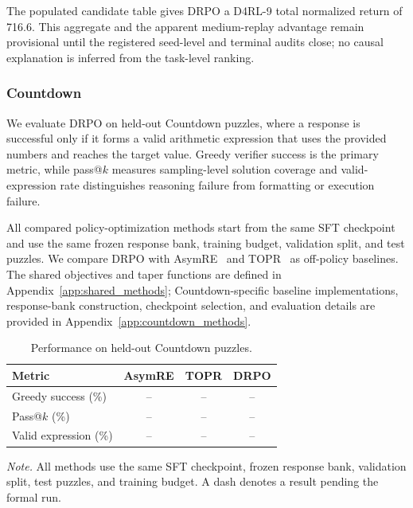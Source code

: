 The populated candidate table gives DRPO a D4RL-9 total normalized
return of 716.6. This aggregate and the apparent medium-replay advantage
remain provisional until the registered seed-level and terminal audits
close; no causal explanation is inferred from the task-level ranking.

\subsubsection{Countdown}
\label{sec:countdown_performance}

We evaluate DRPO on held-out Countdown puzzles, where a response is
successful only if it forms a valid arithmetic expression that uses the
provided numbers and reaches the target value. Greedy verifier success
is the primary metric, while pass@$k$ measures sampling-level solution
coverage and valid-expression rate distinguishes reasoning failure from
formatting or execution failure.

All compared policy-optimization methods start from the same SFT
checkpoint and use the same frozen response bank, training budget,
validation split, and test puzzles. We compare DRPO with
AsymRE~\citep{arnal2025asymmetric} and
TOPR~\citep{leroux2025tapered} as off-policy baselines.
The shared objectives and taper functions are defined in
Appendix~\ref{app:shared_methods}; Countdown-specific baseline
implementations, response-bank construction, checkpoint selection, and
evaluation details are provided in
Appendix~\ref{app:countdown_methods}.

\begin{table}[t]
\centering
\caption{Performance on held-out Countdown puzzles.}
\label{tab:countdown_performance}

\small
\renewcommand{\arraystretch}{1.10}
\setlength{\tabcolsep}{5.0pt}

\begin{tabular*}{\columnwidth}{@{\extracolsep{\fill}}lccc}
\toprule
Metric
&
AsymRE
&
TOPR
&
\textbf{DRPO}
\\
\midrule

Greedy success (\%)
& --
& --
& --
\\

Pass@$k$ (\%)
& --
& --
& --
\\

Valid expression (\%)
& --
& --
& --
\\

\bottomrule
\end{tabular*}

\vspace{2pt}

\begin{minipage}{\columnwidth}
\small
\textit{Note.}
All methods use the same SFT checkpoint, frozen response bank,
validation split, test puzzles, and training budget. A dash denotes a
result pending the formal run.
\end{minipage}

\end{table}

